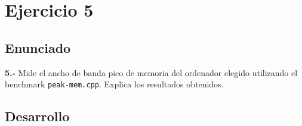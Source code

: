 \section{Ejercicio 5}
\subsection{Enunciado}
\begin{ejer}
    \textbf{5.-} Mide el ancho de banda pico de memoria del ordenador elegido utilizando el benchmark \texttt{peak-mem.cpp}.
    Explica los resultados obtenidos.
\end{ejer}
\subsection{Desarrollo}
